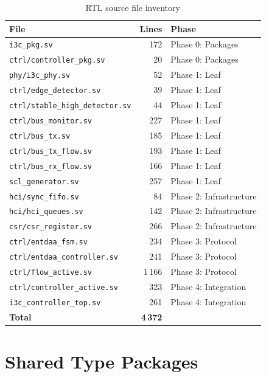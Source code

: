 \documentclass[12pt, a4paper, oneside]{report}
\newcommand{\file}[1]{\texttt{#1}}
\begin{document}
\begin{table}[H]
\centering
\caption{RTL source file inventory}
\label{tab:rtl_files}
\begin{tabular}{L{6cm} rL{5cm}}
\toprule
\textbf{File} & \textbf{Lines} & \textbf{Phase} \\
\midrule
\file{i3c\_pkg.sv}              & 172 & Phase 0: Packages \\
\file{ctrl/controller\_pkg.sv}  &  20 & Phase 0: Packages \\
\file{phy/i3c\_phy.sv}          &  52 & Phase 1: Leaf \\
\file{ctrl/edge\_detector.sv}   &  39 & Phase 1: Leaf \\
\file{ctrl/stable\_high\_detector.sv} & 44 & Phase 1: Leaf \\
\file{ctrl/bus\_monitor.sv}     & 227 & Phase 1: Leaf \\
\file{ctrl/bus\_tx.sv}          & 185 & Phase 1: Leaf \\
\file{ctrl/bus\_tx\_flow.sv}    & 193 & Phase 1: Leaf \\
\file{ctrl/bus\_rx\_flow.sv}    & 166 & Phase 1: Leaf \\
\file{scl\_generator.sv}        & 257 & Phase 1: Leaf \\
\file{hci/sync\_fifo.sv}        &  84 & Phase 2: Infrastructure \\
\file{hci/hci\_queues.sv}       & 142 & Phase 2: Infrastructure \\
\file{csr/csr\_register.sv}     & 266 & Phase 2: Infrastructure \\
\file{ctrl/entdaa\_fsm.sv}      & 234 & Phase 3: Protocol \\
\file{ctrl/entdaa\_controller.sv} & 241 & Phase 3: Protocol \\
\file{ctrl/flow\_active.sv}     & 1\,166 & Phase 3: Protocol \\
\file{ctrl/controller\_active.sv} & 323 & Phase 4: Integration \\
\file{i3c\_controller\_top.sv}  & 261 & Phase 4: Integration \\
\midrule
\textbf{Total}                  & \textbf{4\,372} & \\
\bottomrule
\end{tabular}
\end{table}

\section{Shared Type Packages}
\end{document}
